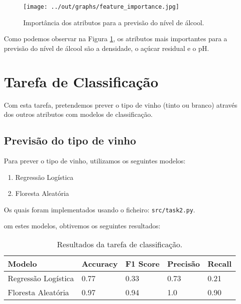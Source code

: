 \documentclass{article}
\begin{document}
\begin{figure}[ht]
  \centering
  \begin{minipage}{0.90\textwidth}
    \centering
    \texttt{[image: ../out/graphs/feature\_importance.jpg]}
    \caption{Importância dos atributos para a previsão do nível de álcool.}
    \label{fig:task1_feature_importance}
  \end{minipage}
\end{figure}

Como podemos observar na Figura \ref{fig:task1_feature_importance}, os atributos mais importantes para a previsão do nível de álcool são a densidade, o açúcar residual e o pH.

\section{Tarefa de Classificação}

Com esta tarefa, pretendemos prever o tipo de vinho (tinto ou branco) através dos outros atributos com modelos de classificação.

\subsection{Previsão do tipo de vinho}

Para prever o tipo de vinho, utilizamos os seguintes modelos:

\begin{enumerate}
  \item Regressão Logística
  \item Floresta Aleatória
\end{enumerate}

Os quais foram implementados usando o ficheiro: \texttt{src/task2.py}.

om estes modelos, obtivemos os seguintes resultados:

\begin{table}[ht]
  \centering
  \begin{tabular}{@{}lllll@{}}
    \toprule
    Modelo & Accuracy & F1 Score & Precisão & Recall \\ \midrule
    Regressão Logística & 0.77 & 0.33 & 0.73 & 0.21 \\
    Floresta Aleatória & 0.97 & 0.94 & 1.0 & 0.90 \\ \bottomrule
  \end{tabular}
  \caption{Resultados da tarefa de classificação.}
  \label{tab:task2_results}
\end{table}
\end{document}

